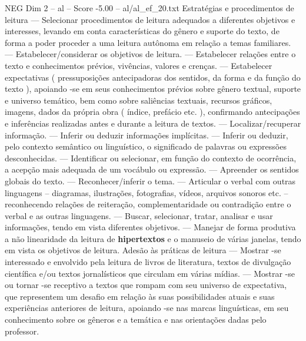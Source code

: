 \begin{textsample}{NEG Dim 2 – al – Score -5.00 – al/al\_ef\_20.txt}
Estratégias e procedimentos de leitura — Selecionar procedimentos de leitura adequados a diferentes objetivos e interesses, levando em conta características do gênero e suporte do texto, de forma a poder proceder a uma leitura autônoma em relação a temas familiares. — Estabelecer/considerar os objetivos de leitura. — Estabelecer relações entre o texto e conhecimentos prévios, vivências, valores e crenças. — Estabelecer expectativas ( pressuposições antecipadoras dos sentidos, da forma e da função do texto ), apoiando -se em seus conhecimentos prévios sobre gênero textual, suporte e universo temático, bem como sobre saliências textuais, recursos gráficos, imagens, dados da própria obra ( índice, prefácio etc. ), confirmando antecipações e inferências realizadas antes e durante a leitura de textos. — Localizar/recuperar informação. — Inferir ou deduzir informações implícitas. — Inferir ou deduzir, pelo contexto semântico ou linguístico, o significado de palavras ou expressões desconhecidas. — Identificar ou selecionar, em função do contexto de ocorrência, a acepção mais adequada de um vocábulo ou expressão. — Apreender os sentidos globais do texto. — Reconhecer/inferir o tema. — Articular o verbal com outras linguagens – diagramas, ilustrações, fotografias, vídeos, arquivos sonoros etc. – reconhecendo relações de reiteração, complementaridade ou contradição entre o verbal e as outras linguagens. — Buscar, selecionar, tratar, analisar e usar informações, tendo em vista diferentes objetivos. — Manejar de forma produtiva a não linearidade da leitura de \textbf{hipertextos} e o manuseio de várias janelas, tendo em vista os objetivos de leitura.
Adesão às práticas de leitura — Mostrar -se interessado e envolvido pela leitura de livros de literatura, textos de divulgação científica e/ou textos jornalísticos que circulam em várias mídias. — Mostrar -se ou tornar -se receptivo a textos que rompam com seu universo de expectativa, que representem um desafio em relação às suas possibilidades atuais e suas experiências anteriores de leitura, apoiando -se nas marcas linguísticas, em seu conhecimento sobre os gêneros e a temática e nas orientações dadas pelo professor.

\end{textsample}

